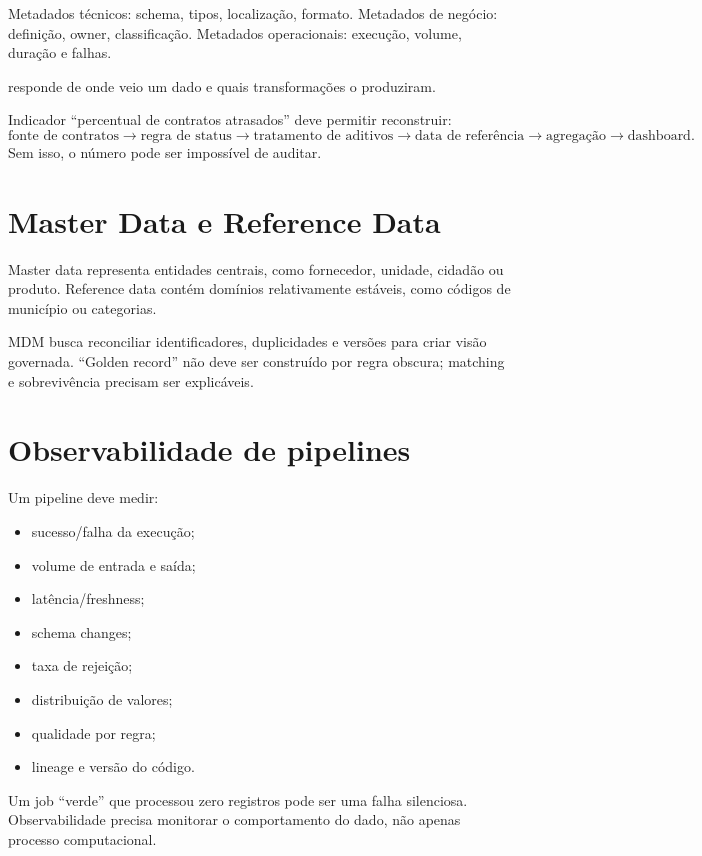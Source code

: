 Metadados técnicos: schema, tipos, localização, formato. Metadados de negócio: definição, owner, classificação. Metadados operacionais: execução, volume, duração e falhas.

 responde de onde veio um dado e quais transformações o produziram.

\begin{example}
Indicador ``percentual de contratos atrasados'' deve permitir reconstruir:
\[
\text{fonte de contratos}\rightarrow
\text{regra de status}\rightarrow
\text{tratamento de aditivos}\rightarrow
\text{data de referência}\rightarrow
\text{agregação}\rightarrow
\text{dashboard}.
\]
Sem isso, o número pode ser impossível de auditar.
\end{example}

\section{Master Data e Reference Data}

Master data representa entidades centrais, como fornecedor, unidade, cidadão ou produto. Reference data contém domínios relativamente estáveis, como códigos de município ou categorias.

MDM busca reconciliar identificadores, duplicidades e versões para criar visão governada. ``Golden record'' não deve ser construído por regra obscura; matching e sobrevivência precisam ser explicáveis.

\section{Observabilidade de pipelines}

Um pipeline deve medir:
\begin{itemize}
\item sucesso/falha da execução;
\item volume de entrada e saída;
\item latência/freshness;
\item schema changes;
\item taxa de rejeição;
\item distribuição de valores;
\item qualidade por regra;
\item lineage e versão do código.
\end{itemize}

Um job ``verde'' que processou zero registros pode ser uma falha silenciosa. Observabilidade precisa monitorar o comportamento do dado, não apenas processo computacional.

